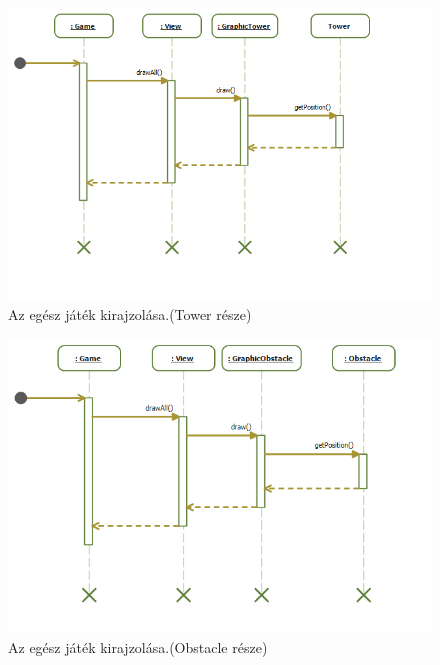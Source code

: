 \begin{figure}[H]
\begin{center}
\includegraphics[width=18cm]{images/grafikaSeq/step2.png}
\caption{Az egész játék kirajzolása.(Tower része)}
\label{fig:Graphic_drawAll_Tower}
\end{center}
\end{figure}

\begin{figure}[H]
\begin{center}
\includegraphics[width=18cm]{images/grafikaSeq/step3.png}
\caption{Az egész játék kirajzolása.(Obstacle része)}
\label{fig:Graphic_drawAll_Obstacle}
\end{center}
\end{figure}

